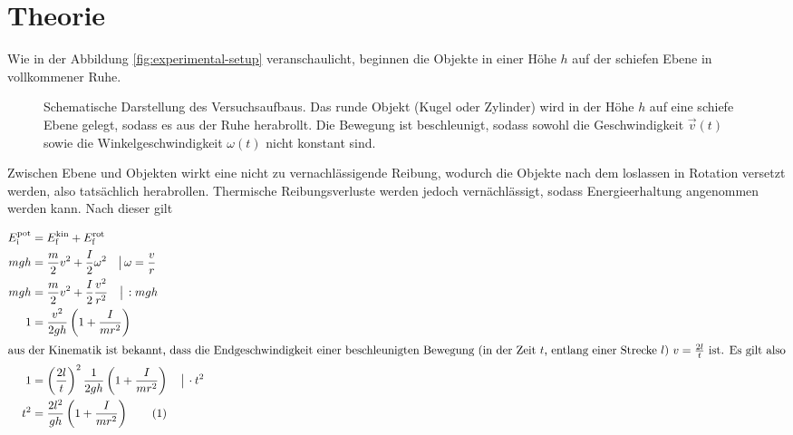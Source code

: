 \section{Theorie}
\label{sec:Theorie}



Wie in der Abbildung \autoref{fig:experimental-setup} veranschaulicht, beginnen die Objekte 
in einer Höhe $h$ auf der schiefen Ebene in vollkommener Ruhe.


\begin{figure}
  \centering
  \caption{Schematische Darstellung des Versuchsaufbaus. Das runde Objekt (Kugel oder Zylinder) wird in der Höhe $h$
  auf eine schiefe Ebene gelegt, sodass es aus der Ruhe herabrollt. Die Bewegung ist beschleunigt, sodass sowohl
  die Geschwindigkeit $\vec{v}(t)$ sowie die Winkelgeschwindigkeit $\omega(t)$ nicht konstant sind.}
  \label{fig:experimental-setup}
\end{figure}



Zwischen Ebene und Objekten wirkt eine nicht zu vernachlässigende Reibung, wodurch die 
Objekte nach dem loslassen in Rotation versetzt werden, also tatsächlich herabrollen.
Thermische Reibungsverluste werden jedoch vernächlässigt, sodass Energieerhaltung
angenommen werden kann. Nach dieser gilt

\begin{align*}
E^\text{pot}_\text{i}  &= E^\text{kin}_\text{f} +  E^\text{rot}_\text{f} \\
mgh &= \frac{m}{2}v^2 + \frac{I}{2}\omega^2 \quad\big|\,\omega = \frac{v}{r} \\
mgh &= \frac{m}{2}v^2 + \frac{I}{2}\frac{v^2}{r^2}\quad\big|\, :mgh \\
1 &= \frac{v^2}{2gh} \left(1 + \frac{I}{mr^2} \right)\\
\intertext{aus der Kinematik ist bekannt, dass die Endgeschwindigkeit einer
beschleunigten Bewegung (in der Zeit $t$, entlang einer Strecke $l$) $v = \frac{2l}{t}$ ist.
Es gilt also}
1 &= \left(\frac{2l}{t}\right)^2 \frac{1}{2gh} \left(1 + \frac{I}{mr^2} \right)\quad\big|\, \cdot t^2 \\
\addtocounter{equation}{1}
t^2 &= \frac{2l^2}{gh} \left(1 + \frac{I}{mr^2} \right)\label{eq:tsquared}\tag{\theequation}
\end{align*}

